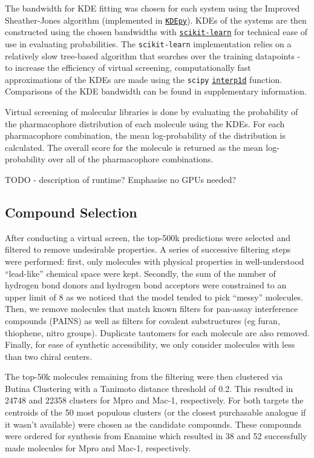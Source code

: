 The bandwidth for KDE fitting was chosen for each system using the Improved Sheather-Jones algorithm \cite{Botev2010ISJ} (implemented in \href{https://kdepy.readthedocs.io/en/latest/index.html}{\texttt{KDEpy}}). KDEs of the systems are then constructed using the chosen bandwidths with \href{https://scikit-learn.org/stable/}{\texttt{scikit-learn}} for technical ease of use in evaluating probabilities. The \texttt{scikit-learn} implementation relies on a relatively slow tree-based algorithm that searches over the training datapoints - to increase the efficiency of virtual screening, computationally fast approximations of the KDEs are made using the \texttt{scipy} \href{https://docs.scipy.org/doc/scipy/reference/generated/scipy.interpolate.interp1d.html#scipy.interpolate.interp1d}{\texttt{interp1d}} function. Comparisons of the KDE bandwidth can be found in supplementary information.

Virtual screening of molecular libraries is done by evaluating the probability of the pharmacophore distribution of each molecule using the KDEs. For each pharmacophore combination, the mean log-probability of the distribution is calculated. The overall score for the molecule is returned as the mean log-probability over all of the pharmacophore combinations.

TODO - description of runtime? Emphasise no GPUs needed?

\subsection{Compound Selection}
After conducting a virtual screen, the top-500k predictions were selected and filtered to remove undesirable properties. A series of successive filtering steps were performed: first, only molecules with physical properties in well-understood ``lead-like'' chemical space \cite{ChemSpace} were kept. Secondly, the sum of the number of hydrogen bond donors and hydrogen bond acceptors were constrained to an upper limit of 8 as we noticed that the model tended to pick ``messy'' molecules. Then, we remove molecules that match known filters for pan-assay interference compounds (PAINS) \cite{Baell2010Pains} as well as filters for covalent substructures (eg furan, thiophene, nitro groups). Duplicate tautomers for each molecule are also removed. Finally, for ease of synthetic accessibility, we only consider molecules with less than two chiral centers.

The top-50k molecules remaining from the filtering were then clustered via Butina Clustering \cite{Butina1999Clustering} with a Tanimoto distance threshold of 0.2. This resulted in 24748 and 22358 clusters for Mpro and Mac-1, respectively. For both targets the centroids of the 50 most populous clusters (or the closest purchasable analogue if it wasn't available) were chosen as the candidate compounds. These compounds were ordered for synthesis from Enamine which resulted in 38 and 52 successfully made molecules for Mpro and Mac-1, respectively.

